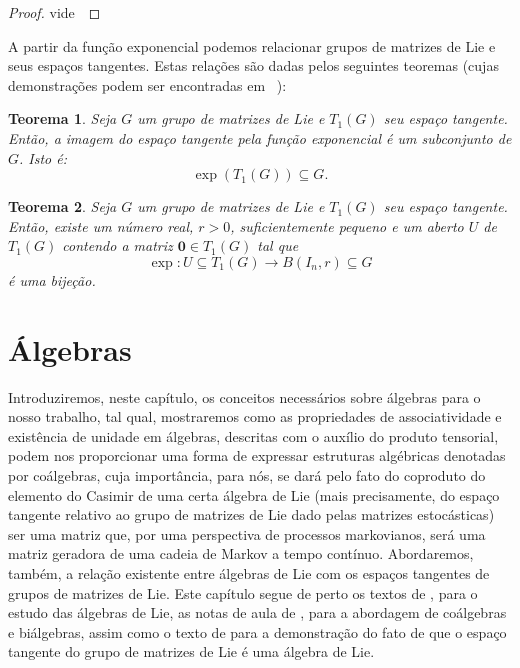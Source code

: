 \documentclass[twoside,openright,titlepage,numbers=noenddot,headinclude,  lineheaders footinclude=true,cleardoublepage=empty,
                                BCOR=5mm,paper=a4,fontsize=12pt ]{scrbook}
\newtheorem{teo}{Teorema}[chapter]
\theoremstyle{definition}
\begin{document}
\begin{proof}
vide~\cite{stillwell}
\end{proof}

A partir da função exponencial podemos relacionar grupos de matrizes de Lie e seus espaços tangentes. 
Estas relações são dadas pelos seguintes
teoremas (cujas demonstrações podem ser encontradas em~\cite[capítulo 7, p.~143 e 149]{stillwell} ):
\begin{teo}\label{imagem_tg}
Seja $G$ um grupo de matrizes de Lie e $T_1(G)$ seu espaço tangente. Então, a imagem do espaço
tangente pela função exponencial é um subconjunto de $G$. Isto é:
\[ \exp( T_1(G) ) \subseteq G .\]
\end{teo}
\begin{teo}\label{bijecao_exp}
Seja $G$ um grupo de matrizes de Lie e $T_1(G)$ seu espaço tangente. 
Então, existe um número real, $r > 0$, suficientemente pequeno
e um aberto $U$ de $T_1(G)$ contendo a matriz $\mathbf{0} \in T_1(G)$ tal que
\[ \exp: U \subseteq T_1(G) \rightarrow B(I_n, r) \subseteq G\]
é uma bijeção.
\end{teo}





\chapter{\'Algebras}
Introduziremos, neste capítulo, os conceitos necessários sobre álgebras para o nosso trabalho,
 tal qual, mostraremos como as
propriedades de associatividade e existência de unidade em álgebras, descritas com o auxílio
do produto tensorial, podem nos proporcionar uma forma de expressar estruturas algébricas
denotadas por coálgebras, cuja importância, para nós, se dará pelo fato do
coproduto do elemento do Casimir de uma certa álgebra de Lie (mais precisamente, do espaço tangente relativo ao
grupo de matrizes de Lie dado pelas matrizes estocásticas) ser uma matriz que, por uma perspectiva de processos
markovianos, será uma matriz
geradora de uma cadeia de Markov a tempo contínuo. Abordaremos, também, a relação existente entre álgebras de Lie
com os espaços tangentes de grupos de matrizes de Lie.
Este capítulo segue de perto os textos de \cite{algebra}, para o estudo das álgebras de Lie,
as notas de aula de \cite{coalgebra}, para a abordagem de coálgebras e biálgebras, assim como o 
texto de \cite{stillwell} para a demonstração do fato de que o espaço
tangente do grupo de matrizes de Lie é uma álgebra de Lie.
\end{document}
